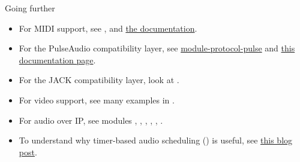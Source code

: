 \begin{frame}{Going further}
  \begin{itemize}

  \item For MIDI support, see , 
    and \href{https://docs.pipewire.org/page_midi.html}{the documentation}.

  \item For the PulseAudio compatibility layer, see
    \href{https://docs.pipewire.org/page_module_protocol_pulse.html}{module-protocol-pulse}
    and
    \href{https://docs.pipewire.org/page_pulseaudio.html}{this documentation page}.

  \item For the JACK compatibility layer, look at .

  \item For video support, see many examples in .

  \item For audio over IP, see modules , ,
    , , , .

  \item To understand why timer-based audio scheduling () is
    useful, see
    \href{https://0pointer.net/blog/projects/pulse-glitch-free.html}{this blog post}.

  \end{itemize}
\end{frame}
